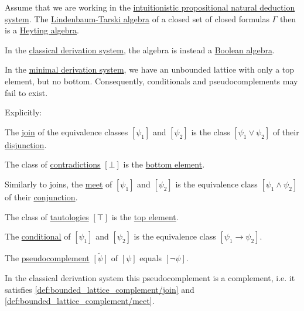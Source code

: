 \begin{proposition}\label{thm:intuitionistic_lindenbaum_tarski_algebra}
  Assume that we are working in the \hyperref[def:intuitionistic_propositional_deductive_systems]{intuitionistic propositional natural deduction system}. The \hyperref[def:lindenbaum_tarski_algebra]{Lindenbaum-Tarski algebra} of a closed set of closed formulas \( \Gamma \) then is a \hyperref[def:heyting_algebra]{Heyting algebra}.

  In the \hyperref[def:classical_propositional_deductive_systems]{classical derivation system}, the algebra is instead a \hyperref[def:boolean_algebra]{Boolean algebra}.

  In the \hyperref[def:minimal_propositional_axiomatic_deductive_system]{minimal derivation system}, we have an unbounded lattice with only a top element, but no bottom. Consequently, conditionals and pseudocomplements may fail to exist.

  Explicitly:
  \begin{thmenum}
     The \hyperref[def:semilattice/join]{join} of the equivalence classes \( [\psi_1] \) and \( [\psi_2] \) is the class \( [\psi_1 \vee \psi_2] \) of their \hyperref[def:propositional_language/connectives/disjunction]{disjunction}.

     The class of \hyperref[def:propositional_semantics/contradiction]{contradictions} \( [\bot] \) is the \hyperref[def:partially_ordered_set_extremal_points/top_and_bottom]{bottom element}.

     Similarly to joins, the \hyperref[def:semilattice/meet]{meet} of \( [\psi_1] \) and \( [\psi_2] \) is the equivalence class \( [\psi_1 \wedge \psi_2] \) of their \hyperref[def:propositional_language/connectives/conjunction]{conjunction}.

     The class of \hyperref[def:propositional_semantics/tautology]{tautologies} \( [\top] \) is the \hyperref[def:partially_ordered_set_extremal_points/top_and_bottom]{top element}.

     The \hyperref[eq:def:heyting_algebra/conditional]{conditional} of \( [\psi_1] \) and \( [\psi_2] \) is the equivalence class \( [\psi_1 \rightarrow \psi_2] \).

     The \hyperref[eq:def:heyting_algebra/pseudocomplement]{pseudocomplement} \( \widetilde{[\psi]} \) of \( [\psi] \) equals \( [\neg \psi] \).

    In the classical derivation system this pseudocomplement is a complement, i.e. it satisfies \eqref{def:bounded_lattice_complement/join} and \eqref{def:bounded_lattice_complement/meet}.
  \end{thmenum}
\end{proposition}
